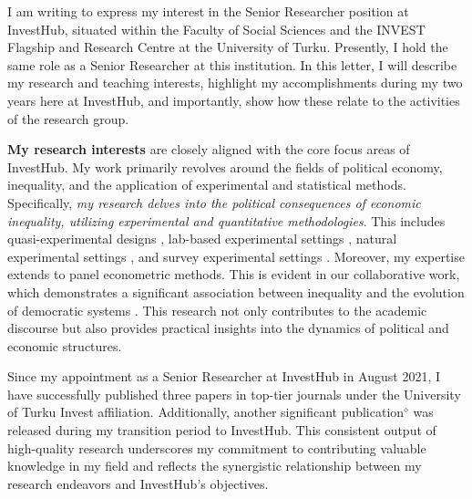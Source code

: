 \documentclass[10pt,stdletter,dateno,sigleft]{newlfm} %
\begin{document}
\begin{newlfm}


\vspace{-2cm}I am writing to express my interest in the Senior Researcher position at InvestHub, situated within the Faculty of Social Sciences and the INVEST Flagship and Research Centre at the University of Turku. Presently, I hold the same role as a Senior Researcher at this institution. In this letter, I will describe my research and teaching interests, highlight my accomplishments during my two years here at InvestHub, and importantly, show how these relate to the activities of the research group.

{\bf My research interests} are closely aligned with the core focus areas of InvestHub. My work primarily revolves around the fields of political economy, inequality, and the application of experimental and statistical methods. Specifically, \emph{my research delves into the political consequences of economic inequality, utilizing experimental and quantitative methodologies}. This includes quasi-experimental designs \parencite{Bahamonde2018}, lab-based experimental settings \parencite{Bahamonde2022b}, natural experimental settings \parencite{Bahamonde:2023}, and survey experimental settings \parencite{Bahamonde2020a}. Moreover, my expertise extends to panel econometric methods. This is evident in our collaborative work, which demonstrates a significant association between inequality and the evolution of democratic systems \parencite{Bahamonde2021}. This research not only contributes to the academic discourse but also provides practical insights into the dynamics of political and economic structures.

Since my appointment as a Senior Researcher at InvestHub in August 2021, I have successfully published three papers in top-tier journals under the University of Turku Invest affiliation. Additionally, another significant publication$^{\diamond}$ was released during my transition period to InvestHub. This consistent output of high-quality research underscores my commitment to contributing valuable knowledge in my field and reflects the synergistic relationship between my research endeavors and InvestHub's objectives.


\end{newlfm}
\end{document}
